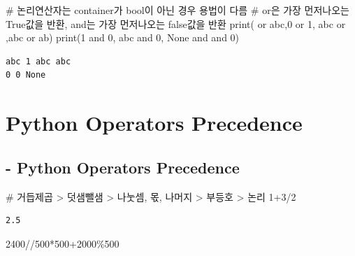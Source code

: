 \documentclass[
  letterpaper,
  DIV=11,
  numbers=noendperiod]{scrreprt}
\newenvironment{Shaded}{\begin{snugshade}}{\end{snugshade}}
\newcommand{\BuiltInTok}[1]{\textcolor[rgb]{0.00,0.23,0.31}{#1}}
\newcommand{\CommentTok}[1]{\textcolor[rgb]{0.37,0.37,0.37}{#1}}
\newcommand{\DecValTok}[1]{\textcolor[rgb]{0.68,0.00,0.00}{#1}}
\newcommand{\KeywordTok}[1]{\textcolor[rgb]{0.00,0.23,0.31}{#1}}
\newcommand{\NormalTok}[1]{\textcolor[rgb]{0.00,0.23,0.31}{#1}}
\newcommand{\OperatorTok}[1]{\textcolor[rgb]{0.37,0.37,0.37}{#1}}
\newcommand{\StringTok}[1]{\textcolor[rgb]{0.13,0.47,0.30}{#1}}
\newcommand{\VariableTok}[1]{\textcolor[rgb]{0.07,0.07,0.07}{#1}}
\begin{document}
\begin{Shaded}
\begin{Highlighting}[]
\CommentTok{\# 논리연산자는 container가 bool이 아닌 경우 용법이 다름}
\CommentTok{\# or은 가장 먼저나오는 True값을 반환, and는 가장 먼저나오는 false값을 반환}
\BuiltInTok{print}\NormalTok{(}\StringTok{\textquotesingle{}\textquotesingle{}} \KeywordTok{or} \StringTok{\textquotesingle{}abc\textquotesingle{}}\NormalTok{,}\DecValTok{0} \KeywordTok{or} \DecValTok{1}\NormalTok{, }\StringTok{\textquotesingle{}abc\textquotesingle{}} \KeywordTok{or} \StringTok{\textquotesingle{}\textquotesingle{}}\NormalTok{,}\StringTok{\textquotesingle{}abc\textquotesingle{}} \KeywordTok{or} \StringTok{\textquotesingle{}ab\textquotesingle{}}\NormalTok{)}
\BuiltInTok{print}\NormalTok{(}\DecValTok{1} \KeywordTok{and} \DecValTok{0}\NormalTok{, }\StringTok{\textquotesingle{}abc\textquotesingle{}} \KeywordTok{and} \DecValTok{0}\NormalTok{, }\VariableTok{None} \KeywordTok{and} \StringTok{\textquotesingle{}\textquotesingle{}} \KeywordTok{and} \DecValTok{0}\NormalTok{)}
\end{Highlighting}
\end{Shaded}

\begin{verbatim}
abc 1 abc abc
0 0 None
\end{verbatim}

\section{Python Operators Precedence}\label{python-operators-precedence}

\subsection{- Python Operators
Precedence}\label{python-operators-precedence-1}

\begin{Shaded}
\begin{Highlighting}[]
\CommentTok{\# 거듭제곱 \textgreater{} 덧샘뺄샘 \textgreater{} 나눗셈, 몫, 나머지 \textgreater{} 부등호 \textgreater{} 논리}
\DecValTok{1}\OperatorTok{+}\DecValTok{3}\OperatorTok{/}\DecValTok{2}
\end{Highlighting}
\end{Shaded}

\begin{verbatim}
2.5
\end{verbatim}

\begin{Shaded}
\begin{Highlighting}[]
\DecValTok{2400}\OperatorTok{//}\DecValTok{500}\OperatorTok{*}\DecValTok{500}\OperatorTok{+}\DecValTok{2000}\OperatorTok{\%}\DecValTok{500}
\end{Highlighting}
\end{Shaded}
\end{document}
